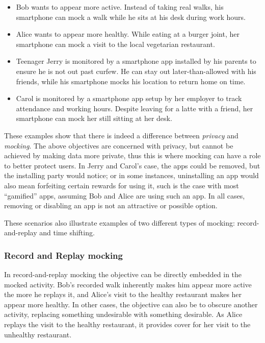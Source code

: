 \begin{itemize}

\item Bob wants to appear more active. Instead of taking real walks, his
smartphone can mock a walk while he sits at his desk during work hours.

\item Alice wants to appear more healthy. While eating at a burger joint, her
smartphone can mock a visit to the local vegetarian restaurant.

\item Teenager Jerry is monitored by a smartphone app installed by his parents
to ensure he is not out past curfew. He can stay out later-than-allowed with
his friends, while his smartphone mocks his location to return home on time.

\item Carol is monitored by a smartphone app setup by her employer to track
attendance and working hours. Despite leaving for a latte with a friend, her
smartphone can mock her still sitting at her desk.

\end{itemize}

\vspace*{-0.2in}

These examples show that there is indeed a difference between \textit{privacy}
and \textit{mocking}. The above objectives are concerned with privacy, but
cannot be achieved by making data more private, thus this is where mocking can
have a role to better protect users. In Jerry and Carol's case, the apps could
be removed, but the installing party would notice; or in some instances,
uninstalling an app would also mean forfeiting certain rewards for using it,
such is the case with most ``gamified'' apps, assuming Bob and Alice are using
such an app. In all cases, removing or disabling an app is not an attractive or
possible option.

These scenarios also illustrate examples of two different types of
mocking: record-and-replay and time shifting.

\subsubsection{Record and Replay mocking}

In record-and-replay mocking the objective can be directly embedded in the
mocked activity. Bob's recorded walk inherently makes him appear more active
the more he replays it, and Alice's visit to the healthy restaurant makes her
appear more healthy. In other cases, the objective can also be to obscure
another activity, replacing something undesirable with something desirable.
As Alice replays the visit to the healthy restaurant, it provides cover for
her visit to the unhealthy restaurant.

